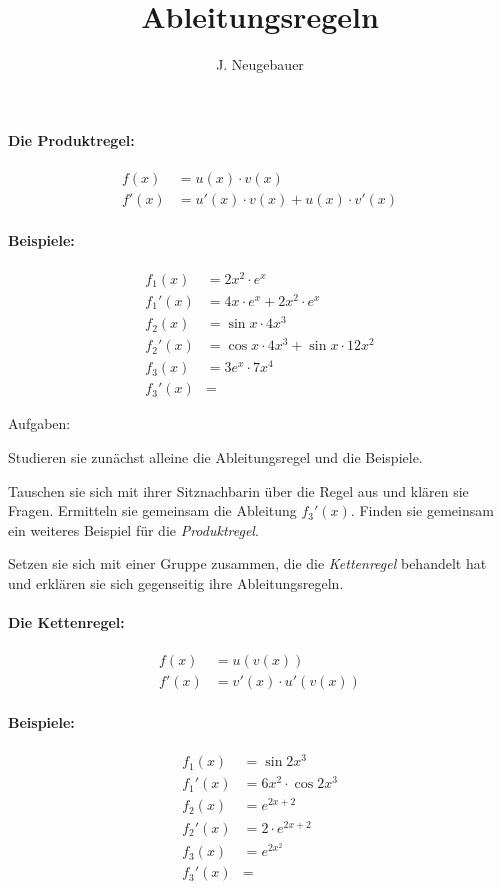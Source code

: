 \documentclass[10pt, a5paper, landscape]{scrartcl}
\author{J. Neugebauer}
\title{Ableitungsregeln}
\date{\Heute}
\begin{document}
	\begin{multicols}{2}
		\paragraph{Die Produktregel:}
		\begin{align*}
			f(x) &= u(x)\cdot v(x) \\
			f'(x) &= u'(x)\cdot v(x) + u(x)\cdot v'(x)
		\end{align*}
		
		\paragraph{Beispiele:}
		\begin{align*}
		f_1(x)  &= 2x^2\cdot e^x \\
		f_1'(x) &= 4x\cdot e^x + 2x^2\cdot e^x\\[1em]
		f_2(x)  &= \sin{x}\cdot 4x^3 \\
		f_2'(x) &= \cos{x}\cdot 4x^3 + \sin{x}\cdot 12x^2\\[1em]
		f_3(x)  &= 3e^x\cdot 7x^4 \\
		f_3'(x) &= 
		\end{align*}
	\end{multicols}

	Aufgaben:
	\begin{enumeraten}
		\item[\Large\symEinzel] Studieren sie zunächst alleine die Ableitungsregel und die Beispiele.
		\item[\Large\symPartner] Tauschen sie sich mit ihrer Sitznachbarin über die Regel aus und klären sie Fragen. Ermitteln sie gemeinsam die Ableitung $f_3'(x)$. Finden sie gemeinsam ein weiteres Beispiel für die \emph{Produktregel}.
		\item[\Large\symGruppe] Setzen sie sich mit einer Gruppe zusammen, die die \emph{Kettenregel} behandelt hat und erklären sie sich gegenseitig ihre Ableitungsregeln.
	\end{enumeraten}
	
	\clearpage
	\begin{multicols}{2}
		\paragraph{Die Kettenregel:}
		\begin{align*}
		f(x) &= u(v(x)) \\
		f'(x) &= v'(x)\cdot u'(v(x))
		\end{align*}
		
		\paragraph{Beispiele:}
		\begin{align*}
		f_1(x)  &= \sin{2x^3} \\
		f_1'(x) &= 6x^2\cdot \cos{2x^3}\\[1em]
		f_2(x)  &= e^{2x+2} \\
		f_2'(x) &= 2\cdot e^{2x+2}\\[1em]
		f_3(x)  &= e^{2x^2} \\
		f_3'(x) &= 
		\end{align*}
	\end{multicols}
	
\end{document}

